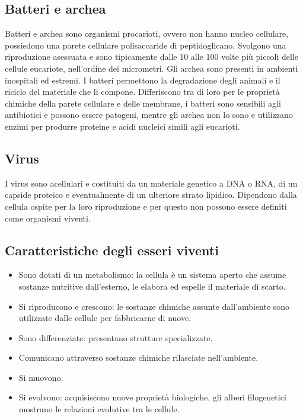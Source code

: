 \subsection{Batteri e archea}
Batteri e archea sono organismi procarioti, ovvero non hanno nucleo cellulare, possiedono una parete cellulare polisaccaride di peptidoglicano. Svolgono una
riproduzione asessuata e sono tipicamente dalle 10 alle 100 volte pi\`u piccoli delle cellule eucariote, nell'ordine dei micrometri. Gli archea sono presenti in ambienti inospitali ed
estremi. I batteri permettono la degradazione degli animali e il riciclo del materiale che li compone. Differiscono tra di loro per le propriet\`a chimiche della parete cellulare e 
delle membrane, i batteri sono sensibili agli antibiotici e possono essere patogeni, mentre gli archea non lo sono e utilizzano enzimi per produrre proteine e acidi nucleici simili 
agli eucarioti. 
\subsection{Virus}
I virus sono acellulari e costituiti da un materiale genetico a DNA o RNA, di un capside proteico e eventualmente di un ulteriore strato lipidico. Dipendono
dalla cellula ospite per la loro riproduzione e per questo non possono essere definiti come organismi viventi. 
\subsection{Caratteristiche degli esseri viventi}
\begin{itemize}
	\item Sono dotati di un metabolismo: la cellula \`e un sistema aperto che assume sostanze nutritive dall'esterno, le elabora ed espelle il materiale di scarto.
	\item Si riproducono e crescono: le sostanze chimiche assunte dall'ambiente sono utilizzate dalle cellule per fabbricarne di nuove.
	\item Sono differenziate: presentano strutture specializzate. 
	\item Comunicano attraverso sostanze chimiche rilasciate nell'ambiente. 
	\item Si muovono.
	\item Si evolvono: acquisiscono nuove propriet\`a biologiche, gli alberi filogenetici mostrano le relazioni evolutive tra le cellule. 
\end{itemize}
